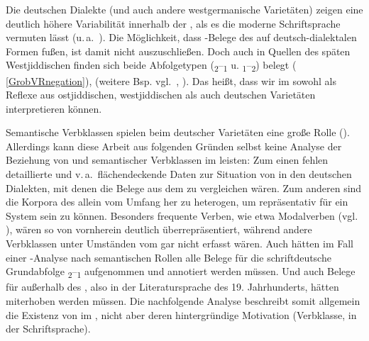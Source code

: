   
Die deutschen Dialekte (und auch andere westgermanische Varietäten) zeigen eine deutlich höhere Variabilität innerhalb der , als es die moderne Schriftsprache vermuten lässt (u.\,a.\, \citealt{Loetscher1978,BestenEdmondson1983,Patocka1997,Vikner1995,Vikner2001,Seiler2004,Wurmbrand2004,Wurmbrand2006,Wurmbrand2012,Sapp2006,Sapp2011,DubenionSmith2010,Schallert2014}). Die Möglichkeit, dass \hai{{\VR}}-Belege des  auf deutsch-dialektalen Formen fußen, ist damit nicht auszuschließen. Doch auch in Quellen des späten Westjiddischen finden sich beide Abfolgetypen (\textsubscript{2}–\textsubscript{1} u. \textsubscript{1}–\textsubscript{2}) belegt ( \ref{GrobVRnegation}), (weitere Bsp. vgl.\, \citealt[36–38]{Schaefer2008}, \citeyear[61f]{Schaefer2010}). Das heißt, dass wir \hai{{\VR}} im \hai{{\LiJi}} sowohl als Reflexe aus ostjiddischen, westjiddischen als auch deutschen Varietäten interpretieren können. 
  

  
 Semantische Verbklassen spielen beim \hai{{\VR}} deutscher Varietäten eine große Rolle (\citealt{Ebert1998,Sapp2006,Sapp2011,Vikner2001,Wurmbrand2004,Wurmbrand2006,Schallert2014}). Allerdings kann diese Arbeit aus folgenden Gründen selbst keine Analyse der Beziehung von \hai{{\VR}} und semantischer Verbklassen im \hai{{\LiJi}} leisten: Zum einen fehlen detaillierte und v.\,a.\, flächendeckende Daten zur Situation von \hai{{\VR}} in den deutschen Dialekten, mit denen die Belege aus dem  zu vergleichen wären. Zum anderen sind die Korpora des \hai{{\LiJi}} allein vom Umfang her zu heterogen, um repräsentativ für ein System sein zu können. Besonders frequente Verben, wie etwa Modalverben (vgl.\, \citealt{Ruoff1981}), wären so von vornherein deutlich überrepräsentiert, während andere Verbklassen unter Umständen vom  gar nicht erfasst wären. Auch hätten im Fall einer \hai{{\VR}}-Analyse nach semantischen Rollen alle Belege für die schriftdeutsche Grundabfolge \textsubscript{2}–\textsubscript{1} aufgenommen und annotiert werden müssen. Und auch Belege für \hai{{\VR}} außerhalb des \hai{{\LiJi}}, also in der Literatursprache des 19. Jahrhunderts, hätten miterhoben werden müssen. Die nachfolgende Analyse beschreibt somit allgemein die Existenz von \hai{{\VR}} im \hai{{\LiJi}}, nicht aber deren hintergründige Motivation (Verbklasse, \hai{{\VR}} in der Schriftsprache). 


